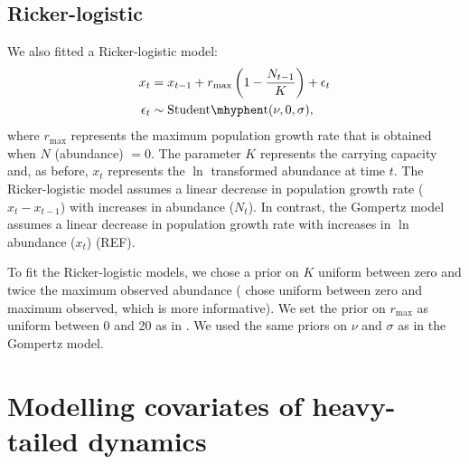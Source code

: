 \subsection{Ricker-logistic}

We also fitted a Ricker-logistic model:
\begin{align*}
x_t &= x_{t-1} + r_{\mathrm{max}}\left(1 - \frac{N_{t-1}}{K}\right) + \epsilon_t\\
\epsilon_t &\sim \mathrm{Student\mhyphen t}(\nu, 0, \sigma),
\end{align*}
where $r_\mathrm{max}$ represents the maximum population growth rate that is obtained when $N$ (abundance) $= 0$. The parameter $K$ represents the carrying capacity and, as before, $x_t$ represents the $\ln$ transformed abundance at time $t$. The Ricker-logistic model assumes a linear decrease in population growth rate ($x_t - x_{t-1}$) with increases in abundance ($N_t$). In contrast, the Gompertz model assumes a linear decrease in population growth rate with increases in $\ln$ abundance ($x_t$) (REF).

To fit the Ricker-logistic models, we chose a prior on $K$ uniform between zero and twice the maximum observed abundance (\citet{clark2010} chose uniform between zero and maximum observed, which is more informative). We set the prior on $r_\mathrm{max}$ as uniform between 0 and 20 as in \citet{clark2010}. We used the same priors on $\nu$ and $\sigma$ as in the Gompertz model.

\section{Modelling covariates of heavy-tailed dynamics}

